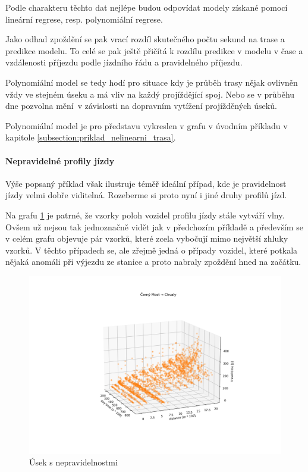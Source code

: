 Podle charakteru těchto dat nejlépe budou odpovídat modely získané pomocí lineární regrese, resp. polynomiální regrese.

\bigbreak

Jako odhad zpoždění se pak vrací rozdíl skutečného počtu sekund na trase a predikce modelu. To celé se pak ještě přičítá k rozdílu predikce v modelu v čase a vzdálenosti příjezdu podle jízdního řádu a pravidelného příjezdu.

\bigbreak

Polynomiální model se tedy hodí pro situace kdy je průběh trasy nějak ovlivněn vždy ve stejném úseku a má vliv na každý projíždějící spoj. Nebo se v průběhu dne pozvolna mění v závislosti na dopravním vytížení projížděných úseků.

Polynomiální model je pro představu vykreslen v grafu v úvodním příkladu v kapitole \ref{subsection:priklad_nelinearni_trasa}.

\paragraph{Nepravidelné profily jízdy}

Výše popsaný příklad však ilustruje téměř ideální případ, kde je pravidelnost jízdy velmi dobře viditelná. Rozeberme si proto nyní i jiné druhy profilů jízd.

\bigbreak

Na grafu \ref{fig:cerny_most_chvaly} je patrné, že vzorky poloh vozidel profilu jízdy stále vytváří vlny. Ovšem už nejsou tak jednoznačně vidět jak v předchozím příkladě a především se v celém grafu objevuje pár vzorků, které zcela vybočují mimo největší zhluky vzorků. V těchto případech se, ale zřejmě jedná o případy vozidel, které potkala nějaká anomáli při výjezdu ze stanice a proto nabraly zpoždění hned na začátku.

\begin{figure}
	\centering
  \includegraphics[width=\linewidth]{../img/cerny_most_chvaly.png}
  \caption{Úsek s nepravidelnostmi}
  \label{fig:cerny_most_chvaly}
\end{figure}

